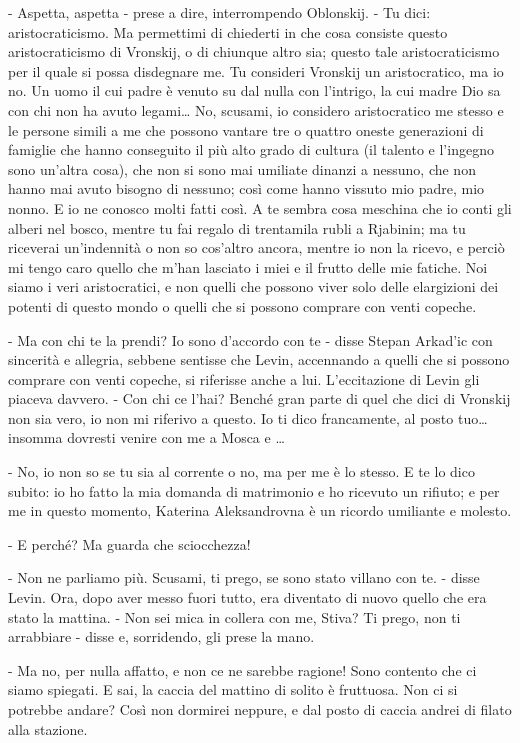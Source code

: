 - Aspetta, aspetta - prese a dire, interrompendo Oblonskij. - Tu dici: aristocraticismo. Ma permettimi di chiederti in che cosa consiste questo aristocraticismo di Vronskij, o di chiunque altro sia; questo tale aristocraticismo per il quale si possa disdegnare me. Tu consideri Vronskij un aristocratico, ma io no. Un uomo il cui padre è venuto su dal nulla con l'intrigo, la cui madre Dio sa con chi non ha avuto legami\ldots{} No, scusami, io considero aristocratico me stesso e le persone simili a me che possono vantare tre o quattro oneste generazioni di famiglie che hanno conseguito il più alto grado di cultura (il talento e l'ingegno sono un'altra cosa), che non si sono mai umiliate dinanzi a nessuno, che non hanno mai avuto bisogno di nessuno; così come hanno vissuto mio padre, mio nonno. E io ne conosco molti fatti così. A te sembra cosa meschina che io conti gli alberi nel bosco, mentre tu fai regalo di trentamila rubli a Rjabinin; ma tu riceverai un'indennità o non so cos'altro ancora, mentre io non la ricevo, e perciò mi tengo caro quello che m'han lasciato i miei e il frutto delle mie fatiche. Noi siamo i veri aristocratici, e non quelli che possono viver solo delle elargizioni dei potenti di questo mondo o quelli che si possono comprare con venti copeche. 

- Ma con chi te la prendi? Io sono d'accordo con te - disse Stepan Arkad'ic con sincerità e allegria, sebbene sentisse che Levin, accennando a quelli che si possono comprare con venti copeche, si riferisse anche a lui. L'eccitazione di Levin gli piaceva davvero. - Con chi ce l'hai? Benché gran parte di quel che dici di Vronskij non sia vero, io non mi riferivo a questo. Io ti dico francamente, al posto tuo\ldots{} insomma dovresti venire con me a Mosca e \ldots{} 

- No, io non so se tu sia al corrente o no, ma per me è lo stesso. E te lo dico subito: io ho fatto la mia domanda di matrimonio e ho ricevuto un rifiuto; e per me in questo momento, Katerina Aleksandrovna è un ricordo umiliante e molesto. 

- E perché? Ma guarda che sciocchezza! 

- Non ne parliamo più. Scusami, ti prego, se sono stato villano con te. - disse Levin. Ora, dopo aver messo fuori tutto, era diventato di nuovo quello che era stato la mattina. - Non sei mica in collera con me, Stiva? Ti prego, non ti arrabbiare - disse e, sorridendo, gli prese la mano. 

- Ma no, per nulla affatto, e non ce ne sarebbe ragione! Sono contento che ci siamo spiegati. E sai, la caccia del mattino di solito è fruttuosa. Non ci si potrebbe andare? Così non dormirei neppure, e dal posto di caccia andrei di filato alla stazione. 

